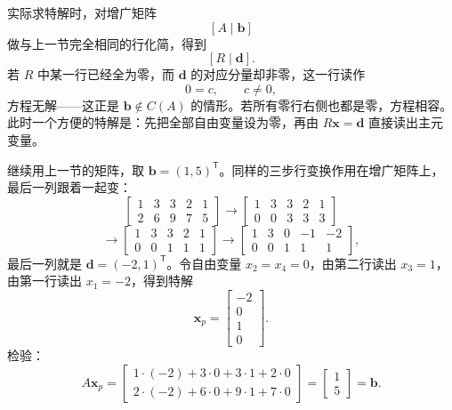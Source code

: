 \documentclass[UTF8,a4paper,12pt]{ctexart}
\numberwithin{equation}{section}
\newcommand{\trans}{^{\mathsf T}}
\begin{document}
	实际求特解时，对增广矩阵
	\begin{equation}\label{eq:5.39}
	[A\mid \bm{b}]
	\end{equation}
	做与上一节完全相同的行化简，得到
	\begin{equation}\label{eq:5.40}
	[R\mid \bm{d}].
	\end{equation}
	若 $R$ 中某一行已经全为零，而 $\bm{d}$ 的对应分量却非零，这一行读作
	\begin{equation}\label{eq:5.41}
	0=c,\qquad c\neq 0,
	\end{equation}
	方程无解——这正是 $\bm{b}\notin C(A)$ 的情形。若所有零行右侧也都是零，方程相容。此时一个方便的特解是：先把全部自由变量设为零，再由 $R\bm{x}=\bm{d}$ 直接读出主元变量。
	
	继续用上一节的矩阵，取 $\bm{b}=(1,5)\trans$。同样的三步行变换作用在增广矩阵上，最后一列跟着一起变：
	\begin{equation}\label{eq:5.42}
	\begin{bmatrix}
		1&3&3&2&1\\
		2&6&9&7&5
	\end{bmatrix}
	\longrightarrow
	\begin{bmatrix}
		1&3&3&2&1\\
		0&0&3&3&3
	\end{bmatrix}
	\end{equation}
	\begin{equation}\label{eq:5.43}
	\longrightarrow
	\begin{bmatrix}
		1&3&3&2&1\\
		0&0&1&1&1
	\end{bmatrix}
	\longrightarrow
	\begin{bmatrix}
		1&3&0&-1&-2\\
		0&0&1&1&1
	\end{bmatrix},
	\end{equation}
	最后一列就是 $\bm{d}=(-2,1)\trans$。令自由变量 $x_2=x_4=0$，由第二行读出 $x_3=1$，由第一行读出 $x_1=-2$，得到特解
	\begin{equation}\label{eq:5.44}
	\bm{x}_p=\begin{bmatrix}-2\\0\\1\\0\end{bmatrix}.
	\end{equation}
	检验：
	\begin{equation}\label{eq:5.45}
	A\bm{x}_p=
	\begin{bmatrix}
		1\cdot(-2)+3\cdot0+3\cdot1+2\cdot0\\
		2\cdot(-2)+6\cdot0+9\cdot1+7\cdot0
	\end{bmatrix}
	=
	\begin{bmatrix}1\\5\end{bmatrix}
	=\bm{b}.
	\end{equation}
\end{document}
